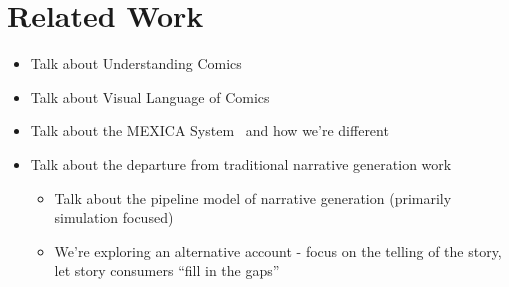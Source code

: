 \section{Related Work}

\begin{itemize}

	\item Talk about Understanding Comics~\cite{mcCloud1993understanding}
	\item Talk about Visual Language of Comics~\cite{cohn2013visual}
	\item Talk about the MEXICA System~\cite{perez2001mexica} and how we're different
	\item Talk about the departure from traditional narrative generation work
	\begin{itemize}
		\item Talk about the pipeline model of narrative generation (primarily 
		simulation focused)
		\item We're exploring an alternative account - 
		focus on the telling of the story, let story consumers ``fill in the gaps''
	\end{itemize}

\end{itemize}